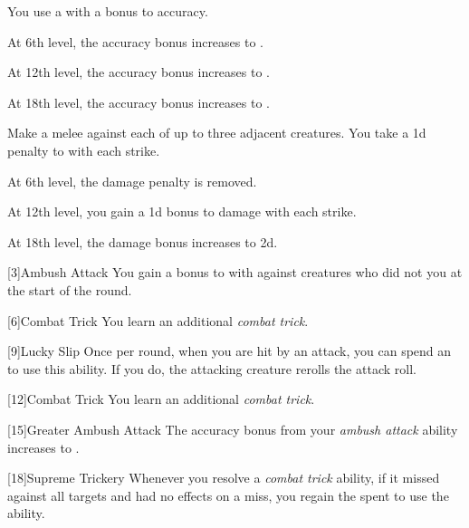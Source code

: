 {             You use a  with a  bonus to accuracy.
            \par At 6th level, the accuracy bonus increases to .
            \par At 12th level, the accuracy bonus increases to .
            \par At 18th level, the accuracy bonus increases to .

             Make a melee  against each of up to three adjacent creatures.
            You take a \minus1d penalty to  with each strike.
            \par At 6th level, the damage penalty is removed.
            \par At 12th level, you gain a \plus1d bonus to damage with each strike.
            \par At 18th level, the damage bonus increases to \plus2d.
        }

        [3]{Ambush Attack}
        You gain a  bonus to  with  against creatures who did not  you at the start of the round.

        [6]{Combat Trick}
        You learn an additional \textit{combat trick}.

        [9]{Lucky Slip}
        Once per round, when you are hit by an attack, you can spend an  to use this ability.
        If you do, the attacking creature rerolls the attack roll.

        [12]{Combat Trick}
        You learn an additional \textit{combat trick}.

        [15]{Greater Ambush Attack}
        The accuracy bonus from your \textit{ambush attack} ability increases to .

        [18]{Supreme Trickery}
        Whenever you resolve a \textit{combat trick} ability, if it missed against all targets and had no effects on a miss, you regain the  spent to use the ability.
